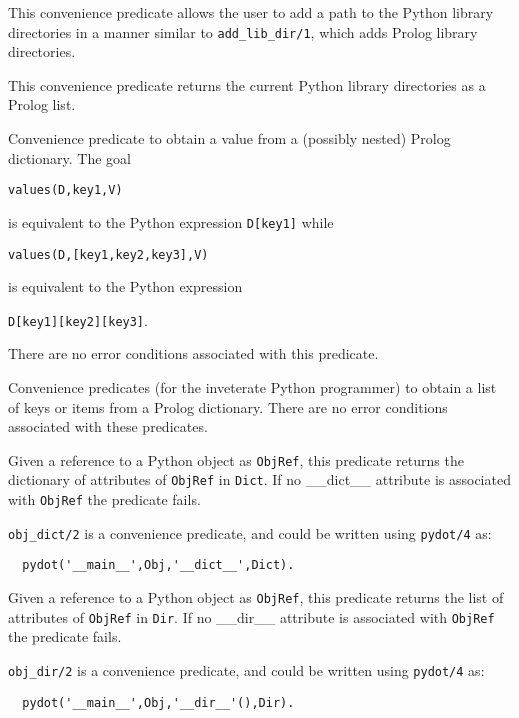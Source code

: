 \begin{description}
%
This convenience predicate allows the user to add a path to the Python
library directories in a manner similar to {\tt add\_lib\_dir/1},
which adds Prolog library directories.

%
This convenience predicate returns the current Python library
directories as a Prolog list.

%
  Convenience predicate to obtain a value from a (possibly nested)
  Prolog dictionary.  The goal

  {\tt values(D,key1,V)}

\noindent
  is equivalent to the
  Python expression {\tt D[key1]} while

  {\tt values(D,[key1,key2,key3],V)}

\noindent
is equivalent to the Python expression

{\tt D[key1][key2][key3]}.

There are no error conditions associated with this predicate.

%
Convenience predicates (for the inveterate Python programmer) to
obtain a list of keys or items from a Prolog dictionary.  There are no
error conditions associated with these predicates.



%
Given a reference to a Python object as {\tt ObjRef}, this predicate
returns the dictionary of attributes of {\tt ObjRef} in {\tt Dict}.
If no \_\_dict\_\_ attribute is associated with {\tt ObjRef} the
predicate fails.

{\tt obj\_dict/2} is a convenience predicate, and could be written
using {\tt pydot/4} as:

\begin{verbatim}
  pydot('__main__',Obj,'__dict__',Dict).
\end{verbatim}

%
Given a reference to a Python object as {\tt ObjRef}, this predicate
returns the list of attributes of {\tt ObjRef} in {\tt Dir}.  If no
\_\_dir\_\_ attribute is associated with {\tt ObjRef} the predicate
fails.

{\tt obj\_dir/2} is a convenience predicate, and could be written
using {\tt pydot/4} as:

\begin{verbatim}
  pydot('__main__',Obj,'__dir__'(),Dir).
\end{verbatim}

\end{description}

